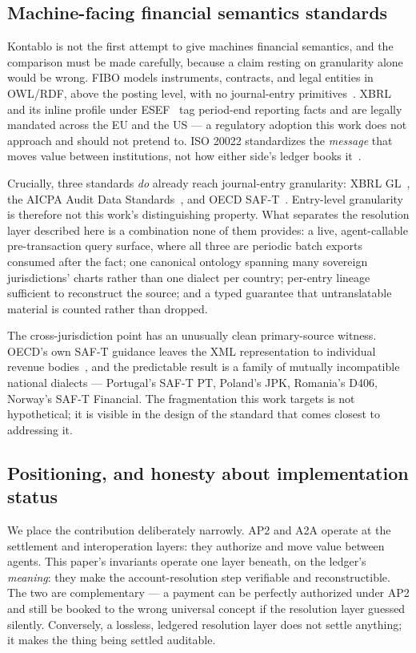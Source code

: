 \documentclass[11pt]{clapps}  %
\begin{document}
\subsection{Machine-facing financial semantics standards}

Kontablo is not the first attempt to give machines financial semantics, and the
comparison must be made carefully, because a claim resting on granularity alone
would be wrong. FIBO models instruments, contracts, and legal entities in
OWL/RDF, above the posting level, with no journal-entry primitives~\cite{fibo}.
XBRL~\cite{xbrl21} and its inline profile under ESEF~\cite{esef_rts} tag
period-end reporting facts and are legally mandated across the EU and the US ---
a regulatory adoption this work does not approach and should not pretend to.
ISO 20022 standardizes the \emph{message} that moves value between institutions,
not how either side's ledger books it~\cite{iso20022}.

Crucially, three standards \emph{do} already reach journal-entry granularity:
XBRL GL~\cite{xbrl_gl}, the AICPA Audit Data Standards~\cite{aicpa_ads}, and
OECD SAF-T~\cite{oecd_saft}. Entry-level granularity is therefore not this
work's distinguishing property. What separates the resolution layer described
here is a combination none of them provides: a live, agent-callable
pre-transaction query surface, where all three are periodic batch exports
consumed after the fact; one canonical ontology spanning many sovereign
jurisdictions' charts rather than one dialect per country; per-entry lineage
sufficient to reconstruct the source; and a typed guarantee that untranslatable
material is counted rather than dropped.

The cross-jurisdiction point has an unusually clean primary-source witness.
OECD's own SAF-T guidance leaves the XML representation to individual revenue
bodies~\cite{oecd_saft}, and the predictable result is a family of mutually
incompatible national dialects --- Portugal's SAF-T PT, Poland's JPK, Romania's
D406, Norway's SAF-T Financial. The fragmentation this work targets is not
hypothetical; it is visible in the design of the standard that comes closest to
addressing it.

\subsection{Positioning, and honesty about implementation status}

We place the contribution deliberately narrowly. AP2 and A2A operate at the
settlement and interoperation layers: they authorize and move value between
agents. This paper's invariants operate one layer beneath, on the ledger's
\emph{meaning}: they make the account-resolution step verifiable and
reconstructible. The two are complementary --- a payment can be perfectly
authorized under AP2 and still be booked to the wrong universal concept if the
resolution layer guessed silently. Conversely, a lossless, ledgered resolution
layer does not settle anything; it makes the thing being settled auditable.
\end{document}

